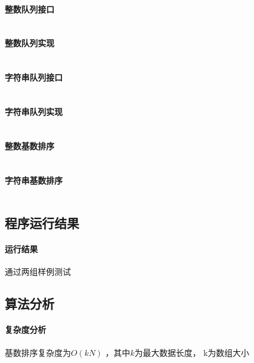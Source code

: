 \documentclass[UTF8]{ctexart}
\begin{document}
      \paragraph{整数队列接口}
      \inputminted{java}{src/sylxjtu/QueueInt.java}
      \paragraph{整数队列实现}
      \inputminted{java}{src/sylxjtu/LoopArrayQueueInt.java}
      \paragraph{字符串队列接口}
      \inputminted{java}{src/sylxjtu/QueueString.java}
      \paragraph{字符串队列实现}
      \inputminted{java}{src/sylxjtu/LoopArrayQueueString.java}
      \paragraph{整数基数排序}
      \inputminted{java}{src/sylxjtu/IntegerRadixSort.java}
      \paragraph{字符串基数排序}
      \inputminted{java}{src/sylxjtu/StringRadixSort.java}
    \subsection{程序运行结果}
      \paragraph{运行结果} 通过两组样例测试
    \subsection{算法分析}
      \paragraph{复杂度分析} 基数排序复杂度为$O(kN)$ ，其中$k$为最大数据长度， k为数组大小
\end{document}

